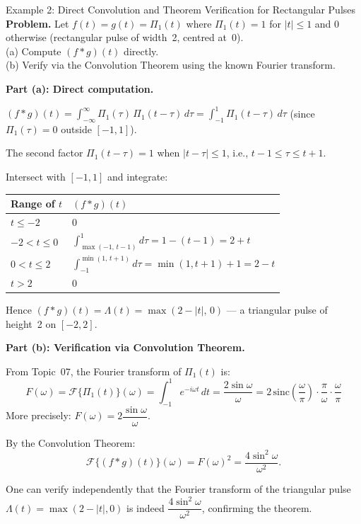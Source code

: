 \documentclass[12pt,a4paper]{article}
\begin{document}
\begin{infobox}{Example 2: Direct Convolution and Theorem Verification for Rectangular Pulses}
\textbf{Problem.} Let $f(t) = g(t) = \Pi_1(t)$ where $\Pi_1(t) = 1$ for $|t| \leq 1$
and $0$ otherwise (rectangular pulse of width~2, centred at~0). \\
(a) Compute $(f*g)(t)$ directly. \\
(b) Verify via the Convolution Theorem using the known Fourier transform.

\medskip
\textbf{Part (a): Direct computation.}

$(f*g)(t) = \int_{-\infty}^{\infty}\Pi_1(\tau)\,\Pi_1(t-\tau)\,d\tau
= \int_{-1}^{1}\Pi_1(t-\tau)\,d\tau$ (since $\Pi_1(\tau)=0$ outside $[-1,1]$).

The second factor $\Pi_1(t-\tau) = 1$ when $|t-\tau| \leq 1$, i.e., $t-1 \leq \tau \leq t+1$.

Intersect with $[-1,1]$ and integrate:

\begin{center}
\begin{tabular}{ll}
\toprule
Range of $t$ & $(f*g)(t)$ \\
\midrule
$t \leq -2$ & $0$ \\
$-2 < t \leq 0$ & $\int_{\max(-1,\,t-1)}^{1}d\tau = 1-(t-1) = 2+t$ \\
$0 < t \leq 2$ & $\int_{-1}^{\min(1,\,t+1)}d\tau = \min(1,t+1)+1 = 2-t$ \\
$t > 2$ & $0$ \\
\bottomrule
\end{tabular}
\end{center}

Hence $(f*g)(t) = \Lambda(t) = \max(2-|t|,\,0)$ --- a triangular pulse of
height~2 on $[-2,2]$.

\medskip
\textbf{Part (b): Verification via Convolution Theorem.}

From Topic~07, the Fourier transform of $\Pi_1(t)$ is:
\[
  F(\omega) = \mathcal{F}\{\Pi_1(t)\}(\omega)
  = \int_{-1}^{1}e^{-i\omega t}\,dt
  = \frac{2\sin\omega}{\omega} = 2\,\mathrm{sinc}\!\left(\frac{\omega}{\pi}\right)\cdot\frac{\pi}{\omega}\cdot\frac{\omega}{\pi}
\]
More precisely: $F(\omega) = 2\dfrac{\sin\omega}{\omega}$.

By the Convolution Theorem:
\[
  \mathcal{F}\{(f*g)(t)\}(\omega) = F(\omega)^2 = \frac{4\sin^2\!\omega}{\omega^2}.
\]

One can verify independently that the Fourier transform of the triangular pulse
$\Lambda(t) = \max(2-|t|,0)$ is indeed $\dfrac{4\sin^2\!\omega}{\omega^2}$,
confirming the theorem.
\end{infobox}
\end{document}
